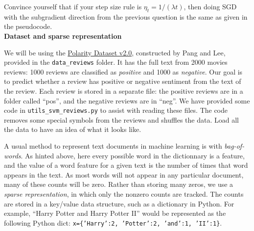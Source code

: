 \documentclass{article}
\newcommand{\wipcom}[1]{\textcolor{red}{WIP: #1}}
\newcommand{\nyuparagrah}[1]{\textcolor{nyupurple}{\large #1}}
\newcommand{\code}[1]{\texttt{#1}}
\theoremstyle{plain}
\theoremstyle{definition}
\begin{document}
\begin{enumerate}
\setcounter{saveenum}{\value{enumi}}
\end{enumerate}

Convince yourself that if your step size rule is $\eta_{t}=1/\left(\lambda t\right)$,
then doing SGD with the subgradient direction from the previous question
is the same as given in the pseudocode. \\


\nyuparagrah{\bf Dataset and sparse representation} 

We will be using the \href{https://www.cs.cornell.edu/people/pabo/movie-review-data/}{Polarity Dataset v2.0},
constructed by Pang and Lee, provided in the \texttt{data\_reviews} folder. It has the full text from 2000 movies
reviews: 1000 reviews are classified as \emph{positive} and 1000 as
\emph{negative}. Our goal is to predict whether a review has positive
or negative sentiment from the text of the review. Each review is
stored in a separate file: the positive reviews are in a folder called
``pos'', and the negative reviews are in ``neg''. We have provided
some code in \texttt{utils\_svm\_reviews.py} to assist with reading these files.
The code removes
some special symbols from the reviews and shuffles the data.
Load all the data to have an idea of what it looks like.

A usual method to represent text documents in machine learning
is with \emph{bag-of-words}. As hinted above, here every possible word in the dictionnary
is a feature, and the value of a word feature for a given text is the number of times that word appears in the text. As most words will not
appear in any particular document, many of these counts will be zero.
Rather than storing many zeros, we use a \emph{sparse representation},
in which only the nonzero counts are tracked. The counts are
stored in a key/value data structure, such as a dictionary in Python. For
example, ``Harry Potter and Harry Potter II'' would be represented
as the following Python dict: \code{x=\{'Harry':2, 'Potter':2, 'and':1, 'II':1\}}.
\end{document}
